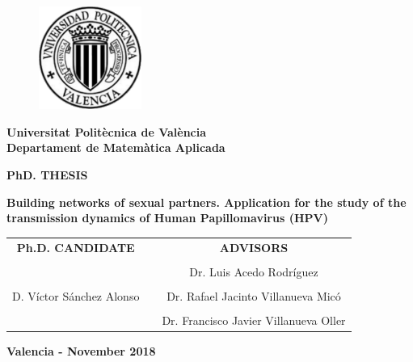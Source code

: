 \thispagestyle{empty}

\begin{figure}[h]
  	\centering
  	 \includegraphics[width=0.3\textwidth]{IMG/escudo_upv_transp.pdf}
\end{figure}
\begin{center}
\textbf{\normalsize Universitat Polit\`{e}cnica de Val\`{e}ncia}\\
\textbf{\normalsize Departament de Matem\`{a}tica Aplicada}

\vspace{1cm}

\scriptsize{\textbf{PhD. THESIS}}

\vspace{0.5cm}

\begin{center}
\textbf{\Huge Building networks of sexual partners. Application for the study of the transmission dynamics of Human Papillomavirus (HPV)}
\end{center}

\vspace{3cm}

\begin{tabular}{ccc}
\textbf{Ph.D. CANDIDATE} 				& \hspace{0.7cm} &\textbf{ADVISORS} \\
 										& \hspace{0.7cm} &\\
 										& \hspace{0.7cm} &\normalsize{Dr. Luis Acedo Rodr\'{i}guez \hfill} \\
										& \hspace{0.7cm} &\\
\normalsize{D. V\'{i}ctor S\'{a}nchez Alonso} 	& \hspace{0.7cm} & \normalsize{Dr. Rafael Jacinto Villanueva Mic\'{o} \hfill } \\ 
										& \hspace{0.7cm} &\\
 										& \hspace{0.7cm} & \normalsize{Dr. Francisco Javier Villanueva Oller \hfill} \\ 
\end{tabular} 

\vspace{2cm}

\normalsize{\textbf{Valencia - November 2018}}

\end{center}
